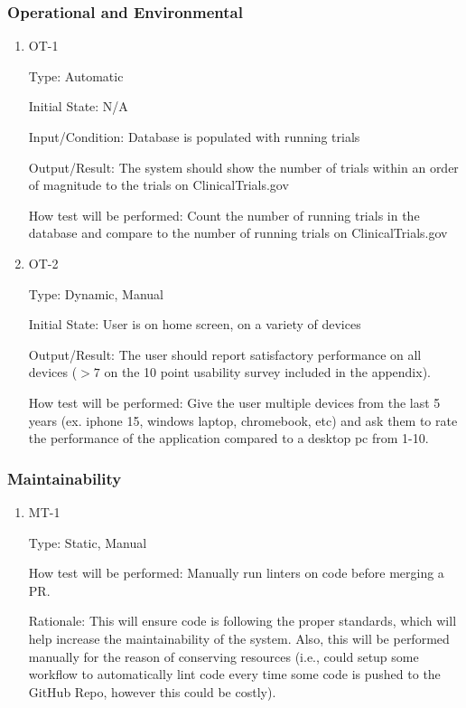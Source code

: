 \documentclass[12pt, titlepage]{article}
\begin{document}
\subsubsection{Operational and Environmental}
		
\begin{enumerate}

\item{OT-1\\}

Type: Automatic
					
Initial State: N/A
					
Input/Condition: Database is populated with running trials
					
Output/Result: The system should show the number of trials within an order of magnitude to the trials on ClinicalTrials.gov
					
How test will be performed: Count the number of running trials in the database and compare to the number of 
running trials on ClinicalTrials.gov

\item{OT-2\\}

Type: Dynamic, Manual
					
Initial State: User is on home screen, on a variety of devices
					
Output/Result: The user should report satisfactory performance on all devices ($>7$ on the 10 point usability survey included in the appendix).
					
How test will be performed: Give the user multiple devices from the last 5 years (ex. iphone 15, windows laptop, chromebook, etc)
and ask them to rate the performance of the application compared to a desktop pc from 1-10.

\end{enumerate}

\subsubsection{Maintainability}

\begin{enumerate}

\item{MT-1\\}

Type: Static, Manual
					
How test will be performed: Manually run linters on code before merging a PR.

Rationale: This will ensure code is following the proper standards, which will help increase the maintainability of the system.
Also, this will be performed manually for the reason of conserving resources (i.e., could setup some workflow to automatically lint 
code every time some code is pushed to the GitHub Repo, however this could be costly).

\end{enumerate}
\end{document}
